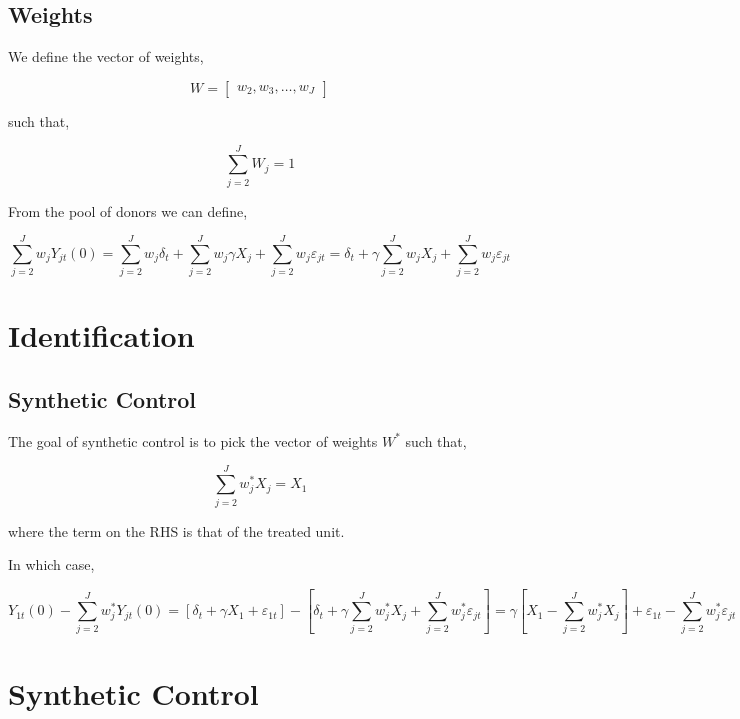 \documentclass[
  letterpaper,
  DIV=11,
  numbers=noendperiod]{scrreprt}
\theoremstyle{definition}
\theoremstyle{remark}
\begin{document}
\subsection*{Weights}\label{weights-2}

We define the vector of weights,

\[
W= \begin{bmatrix}
w_2, w_3, \ldots, w_J
\end{bmatrix}
\]

such that,

\[
\sum_{j=2}^J W_j = 1
\]

From the pool of donors we can define,

\[
\sum_{j=2}^{J} w_{j} Y_{jt}(0) = \sum_{j=2}^{J} w_{j} \delta_{t} + \sum_{j=2}^{J} w_{j} \gamma X_{j} + \sum_{j=2}^{J} w_{j} \varepsilon_{jt} = \delta_{t} + \gamma \sum_{j=2}^{J} w_{j} X_{j} + \sum_{j=2}^{J} w_{j} \varepsilon_{jt}
\]

\section*{Identification}\label{identification}


\subsection*{Synthetic Control}\label{synthetic-control-1}

The goal of synthetic control is to pick the vector of weights \(W^*\)
such that,

\[
\sum_{j=2}^{J} w^*_{j} X_{j} = X_{1}
\]

where the term on the RHS is that of the treated unit.

In which case,

\[
Y_{1t}(0) - \sum_{j=2}^{J} w_{j}^{*} Y_{jt}(0) = \left[ \delta_{t} + \gamma X_{1} + \varepsilon_{1t} \right] - \left[ \delta_{t} + \gamma \sum_{j=2}^{J} w^*_{j} X_{j} + \sum_{j=2}^{J} w_{j}^{*} \varepsilon_{jt} \right] = \gamma \left[ X_{1} - \sum_{j=2}^{J} w_{j}^{*} X_{j} \right] + \varepsilon_{1t} - \sum_{j=2}^{J} w_{j}^{*} \varepsilon_{jt}
\]

\section*{Synthetic Control}\label{synthetic-control-2}
\end{document}
